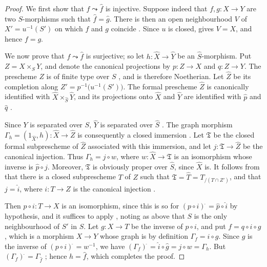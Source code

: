 \begin{proof}
We first show that $f\leadsto\widehat{f}$ is injective.  Suppose indeed that $f,g:X\to Y$ are
two $S$-morphisms such that $\widehat{f}=\widehat{g}$.  There is then
an open neighbourhood $V$ of $X'=u^{-1}(S')$ on which $f$ and $g$
coincide .  Since $u$ is closed,
 gives $V=X$, and hence $f=g$.

We now prove that $f\leadsto\widehat{f}$ is surjective; so let
$h:\widehat{X}\to\widehat{Y}$ be an
$\widehat{S}$-morphism.  Put $Z=X\times_S Y$,
and denote the canonical projections by $p:Z\to X$ and
$q:Z\to Y$.  The prescheme $Z$ is of finite type over $S$
, and is therefore Noetherian.  Let
$\widehat{Z}$ be its completion along $Z'=p^{-1}\bigl(u^{-1}(S')\bigr)$.
The formal prescheme $\widehat{Z}$ is canonically identified with
$\widehat{X}\times_{\widehat{S}}\widehat{Y}$, and its projections
onto $\widehat{X}$ and $\widehat{Y}$ are identified with
$\widehat{p}$ and $\widehat{q}$ .

Since $Y$ is separated over $S$, $\widehat{Y}$ is separated over
$\widehat{S}$ .  The graph morphism $\Gamma_h=(1_{\widehat{X}},h):
\widehat{X}\longrightarrow\widehat{Z}$
is consequently a closed immersion .  Let
$\mathfrak{T}$ be the closed formal subprescheme of
$\widehat{Z}$ associated with this immersion, and let
$j:\mathfrak{T}\to\widehat{Z}$ be the canonical injection.  Thus $\Gamma_h=j\circ w$,
where $w:\widehat{X}\to\mathfrak{T}$ is an isomorphism
 whose inverse is
$\widehat{p}\circ j$.  Moreover, $\mathfrak{T}$ is obviously proper over
$\widehat{S}$, since $\widehat{X}$ is.  It follows from
 that there is a closed subprescheme $T$ of $Z$
such that $\mathfrak{T}
=\widehat{T}
=T_{/(T\cap Z')}$,
and that $j=\widehat{i}$, where $i:T\to Z$ is the canonical
injection .

Then $p\circ i:T\to X$ is an isomorphism, since this is so for
$(p\circ i)^{\widehat{\,}}=\widehat{p}\circ\widehat{i}$ by hypothesis,
and it suffices to apply
, noting as above that $S$ is the only
neighbourhood of $S'$ in $S$.
Let $g:X\to T$ be the inverse of $p\circ i$, and put $f=q\circ i\circ g$,
which is a morphism $X\to Y$ whose graph is by definition $\Gamma_f=i\circ g$.  Since
$\widehat{g}$ is the inverse of
$(p\circ i)^{\widehat{\,}}=w^{-1}$, we have $(\Gamma_f)^{\widehat{\,}}
=\widehat{i}\circ\widehat{g}
=j\circ w
=\Gamma_h$.
But $(\Gamma_f)^{\widehat{\,}}=\Gamma_{\widehat{f}}$
; hence $h=\widehat{f}$, which completes the
proof.
\end{proof}

